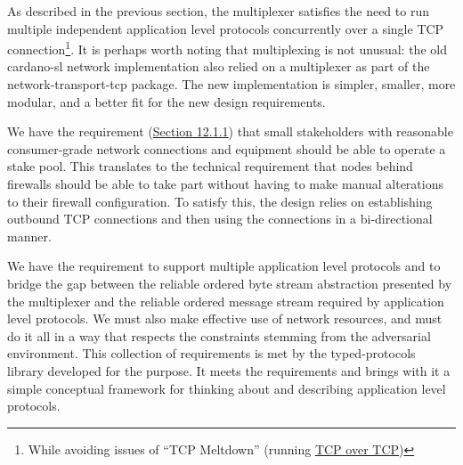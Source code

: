 \documentclass[]{article}
\begin{document}
As described in the previous section, the multiplexer satisfies the need
to run multiple independent application level protocols concurrently
over a single TCP connection\footnote{While avoiding issues of ``TCP
  Meltdown'' (running
  \href{https://en.wikipedia.org/wiki/Tunneling_protocol\#Secure_Shell_tunneling}{{TCP
  over TCP}})}. It is perhaps worth noting that multiplexing is not
unusual: the old cardano-sl network implementation also relied on a
multiplexer as part of the network-transport-tcp package. The new
implementation is simpler, smaller, more modular, and a better fit for
the new design requirements.

We have the requirement
(\protect\hyperlink{network-connectivity}{{Section 12.1.1}}) that small
stakeholders with reasonable consumer-grade network connections and
equipment should be able to operate a stake pool. This translates to the
technical requirement that nodes behind firewalls should be able to take
part without having to make manual alterations to their firewall
configuration. To satisfy this, the design relies on establishing
outbound TCP connections and then using the connections in a
bi-directional manner.

We have the requirement to support multiple application level protocols
and to bridge the gap between the reliable ordered byte stream
abstraction presented by the multiplexer and the reliable ordered
message stream required by application level protocols. We must also
make effective use of network resources, and must do it all in a way
that respects the constraints stemming from the adversarial environment.
This collection of requirements is met by the typed-protocols library
developed for the purpose. It meets the requirements and brings with it
a simple conceptual framework for thinking about and describing
application level protocols.
\end{document}
